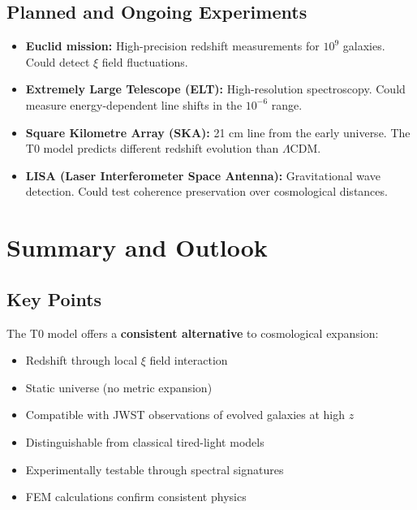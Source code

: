 \subsection{Planned and Ongoing Experiments}

\begin{itemize}
\item \textbf{Euclid mission:} 
      High-precision redshift measurements for $10^9$ galaxies. Could 
      detect $\xi$ field fluctuations.

\item \textbf{Extremely Large Telescope (ELT):} 
      High-resolution spectroscopy. Could measure energy-dependent line 
      shifts in the $10^{-6}$ range.

\item \textbf{Square Kilometre Array (SKA):} 
      21 cm line from the early universe. The T0 model predicts different 
      redshift evolution than $\Lambda$CDM.

\item \textbf{LISA (Laser Interferometer Space Antenna):} 
      Gravitational wave detection. Could test coherence preservation over 
      cosmological distances.
\end{itemize}

\section{Summary and Outlook}

\subsection{Key Points}

The T0 model offers a \textbf{consistent alternative} to cosmological 
expansion:

\begin{itemize}
\item Redshift through local $\xi$ field interaction
\item Static universe (no metric expansion)
\item Compatible with JWST observations of evolved galaxies at high $z$
\item Distinguishable from classical tired-light models
\item Experimentally testable through spectral signatures
\item FEM calculations confirm consistent physics
\end{itemize}

